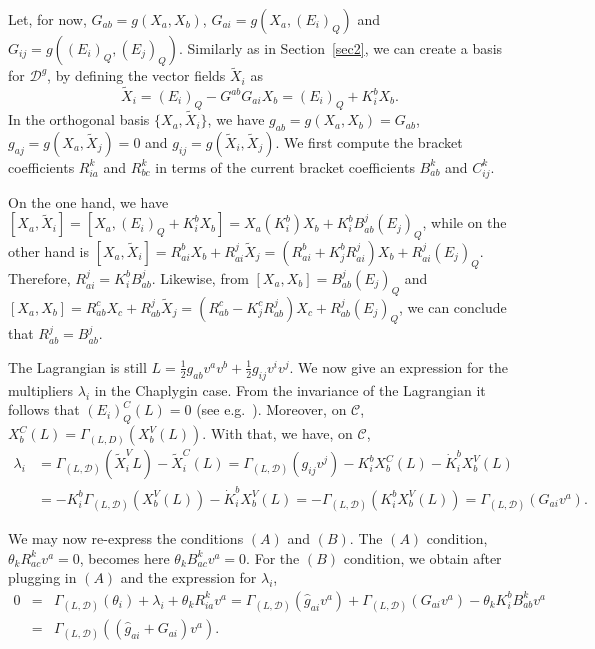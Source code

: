 \documentclass[11pt]{article}
\def\D{{\mathcal D}}
\def\C{{\mathcal C}}
\def\GLD{{\Gamma_{(L,\mathcal{D})}}}
\begin{document}
Let, for now, $G_{ab} = g(X_a,X_b)$, $G_{ai} = g(X_a, ({E}_i)_Q)$ and $G_{ij} = g(({E}_i)_Q,({E}_j)_Q)$. Similarly as  in Section~\ref{sec2}, we can create a basis  for $\mathcal{D}^g$, by defining the vector fields ${\tilde X}_i$ as 
$$
{\tilde X}_i=({E}_i)_Q- {G}^{ab}{G}_{ai}X_b=({E}_i)_Q+ {K}^{b}_{i}X_b.
$$ 
In the orthogonal basis $\{X_a,{\tilde X}_i\}$, we have  $g_{ab} = g(X_a,X_b)=G_{ab}$, $g_{aj} = g(X_a,\tilde{X}_j)=0$ and $g_{ij} = g(\tilde{X}_i,\tilde{X}_j)$.  We first compute the  bracket coefficients $R^k_{ia}$ and $R^k_{bc}$  in terms of the current bracket coefficients $B^k_{ab}$ and $C^k_{ij}$. 

On the one hand, we have
$
[X_a, {\tilde X}_i]= [X_a, ({E}_i)_Q+ {K}^{b}_{i} X_b ]
= X_a ({K}^{b}_{i}) X_b+{K}^{b}_{i} B_{a b}^j ({E}_j)_Q$, while on the other hand is $[X_a, {\tilde X}_i ]=R_{a i}^b X_b+R_{a i}^j {\tilde X}_j=  (R_{a i}^b+ {K}^{b}_{j} R_{a i}^j) X_b+R_{a i}^j ({E}_j)_Q$. Therefore,  $R_{a i}^j= {K}^{b}_{i} B_{a b}^j$. 
Likewise, from $[X_a, X_b]=B_{a b}^j ({E}_j)_Q$ and $[X_a, X_b]=R_{a b}^c X_c+R_{a b}^j {\tilde X}_j  = (R_{a b}^c-K^c_j R_{a b}^j) X_c+R_{a b}^j ({E}_j)_Q$, we can conclude that $R_{a b}^j= B_{a b}^j$.



The Lagrangian is still $L= \frac{1}{2}g_{ab}v^a v^b+\frac{1}{2}g_{ij}v^i v^j$. We now  give an expression for the multipliers $\lambda_i$ in the Chaplygin case. From the invariance of the Lagrangian it follows that $({E}_i)_Q^C(L)=0$ (see e.g.\ \cite{Inv}). Moreover, on $\C$, $X_b^C(L)=\Gamma_{(L, D)}\left(X_b^V(L)\right)$.  With that, we  have, on $\C$,
$$
\begin{aligned}
\lambda_i & =\Gamma_{(L, \D)}\left({\tilde X}_i^V L\right)-{\tilde X}_i^C(L)   =\Gamma_{(L, \D)}\left(g_{i j} v^j\right)- {K}^{b}_{i} X_b^C(L)- {\dot{K}^{b}_{i}} X_b^V(L) \\
& =-{K}^{b}_{i} \GLD \left(X_b^V(L)\right)- {\dot{K}^{b}_{i}} X_b^V(L)  =-\Gamma_{(L, \D)}\left({K}^{b}_{i} X_b^V(L)\right) =
\Gamma_{(L,\mathcal{D})}\left(G_{ai} v^a\right).
\end{aligned}
$$

We may now re-express the conditions $(A)$ and $(B)$. 
The $(A)$ condition, $\theta_k R^k_{ac} v^a =0$, becomes here $\theta_k B^k_{ac} v^a =0$. For the $(B)$ condition, we obtain after plugging in $(A)$ and the expression for $\lambda_i$,
\begin{eqnarray*}
0&=&\Gamma_{(L,\mathcal{D})}(\theta_i)+\lambda_i+\theta_k R^k_{ia}v^a =   \Gamma_{(L,\mathcal{D})}(\hat{g}_{ai}v^a)+ \Gamma_{(L,\mathcal{D})}\left(G_{ai} v^a\right) - \theta_k    K^{b}_{i} B_{a b}^k  v^a\\
  &=& \Gamma_{(L,\mathcal{D})}\left((\hat{g}_{ai}+G_{ai}) v^a\right).
\end{eqnarray*}	
\end{document}
